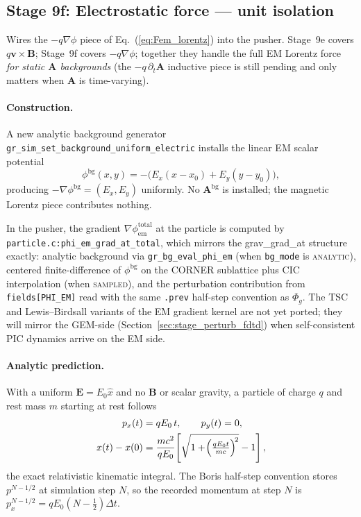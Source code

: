 \documentclass[11pt,a4paper]{article}
\newcommand{\vv}[1]{\mathbf{#1}}
\newcommand{\Phig}{\Phi_g}
\begin{document}
\subsection{Stage 9f: Electrostatic force --- unit isolation}
\label{sec:stage_em_estatic}

Wires the $-q\nabla\phi$ piece of Eq.~(\ref{eq:Fem_lorentz}) into the
pusher.  Stage~9e covers $q\vv{v}\!\times\!\vv{B}$; Stage~9f covers
$-q\nabla\phi$; together they handle the full EM Lorentz force
\emph{for static $\vv{A}$ backgrounds} (the $-q\,\partial_t\vv{A}$
inductive piece is still pending and only matters when $\vv{A}$ is
time-varying).

\paragraph{Construction.}  A new analytic background generator
\texttt{gr\_sim\_set\_background\_uniform\_electric} installs the linear
EM scalar potential
\begin{equation}
\label{eq:em_uniform_e_bg}
  \phi^{\mathrm{bg}}(x, y) = -\bigl(E_x(x - x_0) + E_y(y - y_0)\bigr),
\end{equation}
producing $-\nabla\phi^{\mathrm{bg}} = (E_x, E_y)$ uniformly.  No
$\vv{A}^{\mathrm{bg}}$ is installed; the magnetic Lorentz piece
contributes nothing.

In the pusher, the gradient $\nabla\phi_{\mathrm{em}}^{\mathrm{total}}$
at the particle is computed by
\texttt{particle.c:phi\_em\_grad\_at\_total}, which mirrors the
grav\_grad\_at structure exactly: analytic background via
\texttt{gr\_bg\_eval\_phi\_em} (when \texttt{bg\_mode} is
\textsc{analytic}), centered finite-difference of $\phi^{\mathrm{bg}}$
on the CORNER sublattice plus CIC interpolation (when \textsc{sampled}),
and the perturbation contribution from \texttt{fields[PHI\_EM]} read
with the same \texttt{.prev} half-step convention as $\Phig$.  The
TSC and Lewis--Birdsall variants of the EM gradient kernel are not yet
ported; they will mirror the GEM-side
(Section~\ref{sec:stage_perturb_fdtd}) when self-consistent PIC
dynamics arrive on the EM side.

\paragraph{Analytic prediction.}  With a uniform $\vv{E} = E_0\hat x$
and no $\vv{B}$ or scalar gravity, a particle of charge $q$ and rest
mass $m$ starting at rest follows
\begin{align}
\label{eq:em_uniform_e_dynamics}
  p_x(t)        &= q E_0\,t, \qquad p_y(t) = 0, \\
  x(t) - x(0)   &= \frac{m c^2}{q E_0}\!\left[\sqrt{1 + \!\Bigl(\tfrac{q E_0 t}{m c}\Bigr)^{\!2}} - 1\right],
\end{align}
the exact relativistic kinematic integral.  The Boris half-step
convention stores $p^{N-1/2}$ at simulation step $N$, so the recorded
momentum at step $N$ is $p_x^{N-1/2} = q E_0 (N - \tfrac{1}{2})\Delta t$.
\end{document}
